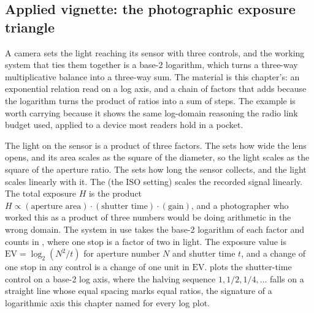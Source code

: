 

\subsection{Applied vignette: the photographic exposure triangle}

A camera sets the light reaching its sensor with three controls, and
the working system that ties them together is a base-2 logarithm, which
turns a three-way multiplicative balance into a three-way sum. The
material is this chapter's: an exponential relation read on a log axis,
and a chain of factors that adds because the logarithm turns the product
of ratios into a sum of steps. The example is worth carrying because it
shows the same log-domain reasoning the radio link budget used, applied
to a device most readers hold in a pocket.

The light on the sensor is a product of three factors. The
 sets how wide the lens opens, and its area scales as
the square of the diameter, so the light scales as the square of the
aperture ratio. The  sets how long the sensor
collects, and the light scales linearly with it. The  (the ISO setting) scales the recorded signal linearly. The total
exposure $H$ is the product $H \propto (\text{aperture area}) \cdot
(\text{shutter time}) \cdot (\text{gain})$, and a photographer who
worked this as a product of three numbers would be doing arithmetic in
the wrong domain. The system in use takes the base-2 logarithm of each
factor and counts in , where one stop is a factor of two
in light. The exposure value is $\mathrm{EV} = \log_{2}(N^{2}/t)$ for
aperture number $N$ and shutter time $t$, and a change of one stop in
any control is a change of one unit in $\mathrm{EV}$.
 plots the shutter-time control on a
base-2 log axis, where the halving sequence $1, 1/2, 1/4, \dots$ falls
on a straight line whose equal spacing marks equal ratios, the signature
of a logarithmic axis this chapter named for every log plot.

